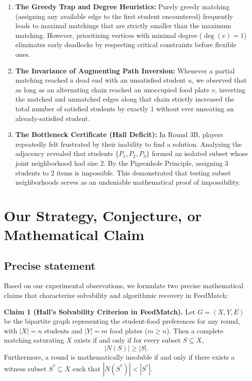 \documentclass[11pt,a4paper]{article}
\begin{document}
\begin{enumerate}
  \item \textbf{The Greedy Trap and Degree Heuristics:} Purely greedy matching (assigning any available edge to the first student encountered) frequently leads to maximal matchings that are strictly smaller than the maximum matching. However, prioritizing vertices with minimal degree ($\deg(v) = 1$) eliminates early deadlocks by respecting critical constraints before flexible ones.
  \item \textbf{The Invariance of Augmenting Path Inversion:} Whenever a partial matching reached a dead end with an unsatisfied student $u$, we observed that as long as an alternating chain reached an unoccupied food plate $v$, inverting the matched and unmatched edges along that chain strictly increased the total number of satisfied students by exactly 1 without ever unseating an already-satisfied student.
  \item \textbf{The Bottleneck Certificate (Hall Deficit):} In Round 3B, players repeatedly felt frustrated by their inability to find a solution. Analyzing the adjacency revealed that students $\{P_1, P_2, P_3\}$ formed an isolated subset whose joint neighborhood had size 2. By the Pigeonhole Principle, assigning 3 students to 2 items is impossible. This demonstrated that testing subset neighborhoods serves as an undeniable mathematical proof of impossibility.
\end{enumerate}

\section{Our Strategy, Conjecture, or Mathematical Claim}

\subsection{Precise statement}
Based on our experimental observations, we formulate two precise mathematical claims that characterize solvability and algorithmic recovery in FeedMatch:

\textbf{Claim 1 (Hall's Solvability Criterion in FeedMatch).} Let $G = (X, Y, E)$ be the bipartite graph representing the student-food preferences for any round, with $|X| = n$ students and $|Y| = m$ food plates ($m \ge n$). Then a complete matching saturating $X$ exists if and only if for every subset $S \subseteq X$,
\[
  |N(S)| \ge |S|.
\]
Furthermore, a round is mathematically insoluble if and only if there exists a witness subset $S^* \subseteq X$ such that $|N(S^*)| < |S^*|$.
\end{document}

